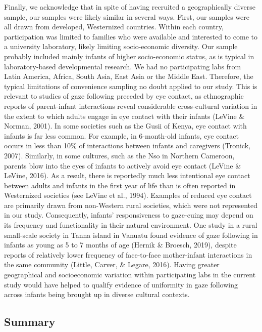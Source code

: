 \documentclass[,man,floatsintext]{apa6}
\begin{document}
Finally, we acknowledge that in spite of having recruited a geographically diverse sample, our samples were likely similar in several ways. First, our samples were all drawn from developed, Westernized countries. Within each country, participation was limited to families who were available and interested to come to a university laboratory, likely limiting socio-economic diversity. Our sample probably included mainly infants of higher socio-economic status, as is typical in laboratory-based developmental research. We had no participating labs from Latin America, Africa, South Asia, East Asia or the Middle East. Therefore, the typical limitations of convenience sampling no doubt applied to our study. This is relevant to studies of gaze following preceded by eye contact, as ethnographic reports of parent-infant interactions reveal considerable cross-cultural variation in the extent to which adults engage in eye contact with their infants (LeVine \& Norman, 2001). In some societies such as the Gusii of Kenya, eye contact with infants is far less common. For example, in 6-month-old infants, eye contact occurs in less than 10\% of interactions between infants and caregivers (Tronick, 2007). Similarly, in some cultures, such as the Nso in Northern Cameroon, parents blow into the eyes of infants to actively avoid eye contact (LeVine \& LeVine, 2016). As a result, there is reportedly much less intentional eye contact between adults and infants in the first year of life than is often reported in Westernized societies (see LeVine et al., 1994). Examples of reduced eye contact are primarily drawn from non-Western rural societies, which were not represented in our study. Consequently, infants' responsiveness to gaze-cuing may depend on its frequency and functionality in their natural environment. One study in a rural small-scale society in Tanna island in Vanuatu found evidence of gaze following in infants as young as 5 to 7 months of age (Hernik \& Broesch, 2019), despite reports of relatively lower frequency of face-to-face mother-infant interactions in the same community (Little, Carver, \& Legare, 2016). Having greater geographical and socioeconomic variation within participating labs in the current study would have helped to qualify evidence of uniformity in gaze following across infants being brought up in diverse cultural contexts.

\hypertarget{summary}{%
\subsection{Summary}\label{summary}}
\end{document}
